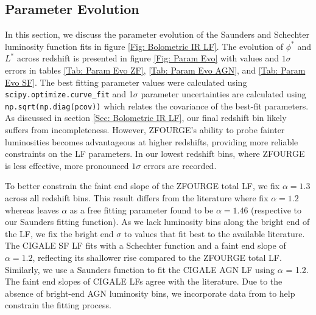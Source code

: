 \subsection{Parameter Evolution} \label{Sec: Parameter Evolution}
In this section, we discuss the parameter evolution of the Saunders and Schechter luminosity function fits in figure \ref{Fig: Bolometric IR LF}. The evolution of $\phi^{*}$ and $L^{*}$ across redshift is presented in figure \ref{Fig: Param Evo} with values and $1\sigma$ errors in tables \ref{Tab: Param Evo ZF}, \ref{Tab: Param Evo AGN}, and \ref{Tab: Param Evo SF}. The best fitting parameter values were calculated using \texttt{scipy.optimize.curve\_fit} \citep{virtanen_scipy_2020} and 1$\sigma$ parameter uncertainties are calculated using \texttt{np.\-sqrt(np.diag(pcov))} \citep{harris_array_2020} which relates the covariance of the best-fit parameters. As discussed in section \ref{Sec: Bolometric IR LF}, our final redshift bin likely suffers from incompleteness. However, ZFOURGE's ability to probe fainter luminosities becomes advantageous at higher redshifts, providing more reliable constraints on the LF parameters. In our lowest redshift bins, where ZFOURGE is less effective, more pronounced $1\sigma$ errors are recorded.

To better constrain the faint end slope of the ZFOURGE total LF, we fix $\alpha=1.3$ across all redshift bins. This result differs from the literature where \cite{rodighiero_mid-_2010, gruppioni_herschel_2013} fix $\alpha=1.2$ whereas \cite{fu_decomposing_2010} leaves $\alpha$ as a free fitting parameter found to be $\alpha=1.46$ (respective to our Saunders fitting function). As we lack luminosity bins along the bright end of the LF, we fix the bright end $\sigma$ to values that fit best to the available literature. The CIGALE SF LF fits with a Schechter function and a faint end slope of $\alpha=1.2$, reflecting its shallower rise compared to the ZFOURGE total LF. Similarly, we use a Saunders function to fit the CIGALE AGN LF using $\alpha$ = 1.2. The faint end slopes of CIGALE LFs agree with the literature. Due to the absence of bright-end AGN luminosity bins, we incorporate data from \cite{thorne_deep_2022} to help constrain the fitting process.

